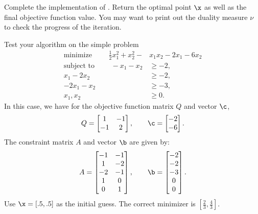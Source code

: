 \begin{problem}
Complete the implementation of .
Return the optimal point $\x$ as well as the final objective function value.
You may want to print out the duality measure $\nu$ to check the progress of the iteration.

Test your algorithm on the simple problem
\begin{align*}
\text{minimize }\qquad \frac{1}{2}x_1^2 + x_2^2 - &x_1x_2 - 2x_1 - 6x_2\\
\text{subject to }\qquad
-x_1-x_2 &\geq -2,\\
x_1-2x_2 &\geq -2,\\
-2x_1-x_2&\geq -3,\\
x_1, x_2 &\geq 0.
\end{align*}
In this case, we have for the objective function matrix $Q$ and vector $\c$,
\[
Q = \begin{bmatrix}
1 & -1\\
-1 & 2
\end{bmatrix},
\qquad
\c = \begin{bmatrix}
-2\\
-6
\end{bmatrix}.
\]
The constraint matrix $A$ and vector $\b$ are given by:
\[
A = \begin{bmatrix}
-1 & -1\\
1 & -2\\
-2 & -1\\
1 & 0\\
0 & 1
\end{bmatrix},
\qquad
\b = \begin{bmatrix}
-2\\
-2\\
-3\\
0\\
0
\end{bmatrix}.
\]
Use $\x = [.5, .5]$ as the initial guess.
The correct minimizer is $\left[\frac{2}{3}, \frac{4}{3}\right].$
\end{problem}

